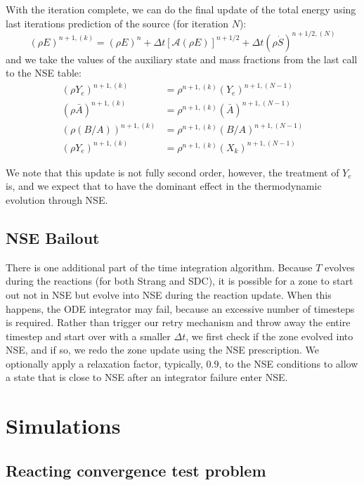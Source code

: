 \documentclass[times,modern]{aastex63}
\newcommand{\Sdot}{\dot{S}}
\newcommand{\Advss}[1]{{\left [{\mathcal{{A}}} \left(#1\right)\right]}}
\begin{document}
With the iteration complete, we can do the final update of the total energy using last iterations prediction of the source (for iteration $N$):
\begin{equation}
(\rho E)^{n+1,(k)} = (\rho E)^n + \Delta t \Advss{\rho E}^{n+1/2} + \Delta t (\rho \Sdot)^{n+1/2,(N)}
\end{equation}
and we take the values of the auxiliary state and mass fractions from the last call to the NSE table:
\begin{align}
(\rho Y_e)^{n+1,(k)} &= \rho^{n+1,(k)} (Y_e)^{n+1,(N-1)} \\
(\rho \bar{A})^{n+1,(k)} &= \rho^{n+1,(k)} (\bar{A})^{n+1,(N-1)} \\
(\rho (B/A))^{n+1,(k)} &= \rho^{n+1,(k)} (B/A)^{n+1,(N-1)} \\
(\rho Y_e)^{n+1,(k)} &= \rho^{n+1,(k)} (X_k)^{n+1,(N-1)}
\end{align}

We note that this update is not fully second order, however, the
treatment of $Y_e$ is, and we expect that to have the dominant effect
in the thermodynamic evolution through NSE.

\subsection{NSE Bailout}

There is one additional part of the time integration algorithm.
Because $T$ evolves during the reactions (for both Strang and SDC), it
is possible for a zone to start out not in NSE but evolve into NSE
during the reaction update.  When this happens, the ODE integrator may
fail, because an excessive number of timesteps is required.  Rather
than trigger our retry mechanism and throw away the entire timestep
and start over with a smaller $\Delta t$, we first check if the zone
evolved into NSE, and if so, we redo the zone update using the NSE
prescription.  {\color{red} We optionally apply a relaxation factor, typically, $0.9$, to the NSE conditions to allow a state that is close to NSE after an integrator failure enter NSE.}

\section{Simulations}

\subsection{Reacting convergence test problem}
\end{document}
